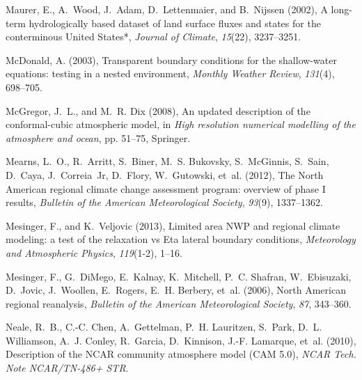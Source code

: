 \documentclass[draft,ms]{agutex}   %
\begin{document}
\begin{article}
\begin{thebibliography}{72}
Maurer, E., A.~Wood, J.~Adam, D.~Lettenmaier, and B.~Nijssen (2002), {A
  long-term hydrologically based dataset of land surface fluxes and states for
  the conterminous United States*}, \textit{Journal of Climate},
  \textit{15}(22), 3237--3251.

McDonald, A. (2003), Transparent boundary conditions for the shallow-water
  equations: testing in a nested environment, \textit{Monthly Weather Review},
  \textit{131}(4), 698--705.

McGregor, J.~L., and M.~R. Dix (2008), An updated description of the
  conformal-cubic atmospheric model, in \textit{High resolution numerical
  modelling of the atmosphere and ocean}, pp. 51--75, Springer.

Mearns, L.~O., R.~Arritt, S.~Biner, M.~S. Bukovsky, S.~McGinnis, S.~Sain,
  D.~Caya, J.~Correia~Jr, D.~Flory, W.~Gutowski, et~al. (2012), {The North
  American regional climate change assessment program: overview of phase I
  results}, \textit{Bulletin of the American Meteorological Society},
  \textit{93}(9), 1337--1362.

Mesinger, F., and K.~Veljovic (2013), {Limited area NWP and regional climate
  modeling: a test of the relaxation vs Eta lateral boundary conditions},
  \textit{Meteorology and Atmospheric Physics}, \textit{119}(1-2), 1--16.

Mesinger, F., G.~DiMego, E.~Kalnay, K.~Mitchell, P.~C. Shafran, W.~Ebisuzaki,
  D.~Jovic, J.~Woollen, E.~Rogers, E.~H. Berbery, et~al. (2006), {North
  American regional reanalysis}, \textit{Bulletin of the American
  Meteorological Society}, \textit{87}, 343--360.

Neale, R.~B., C.-C. Chen, A.~Gettelman, P.~H. Lauritzen, S.~Park, D.~L.
  Williamson, A.~J. Conley, R.~Garcia, D.~Kinnison, J.-F. Lamarque, et~al.
  (2010{}), {Description of the NCAR community atmosphere model
  (CAM 5.0)}, \textit{NCAR Tech. Note NCAR/TN-486+ STR}.


\end{thebibliography}
\end{article}
\end{document}
